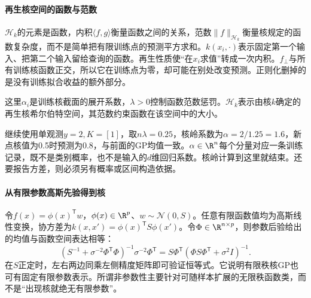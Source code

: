 \paragraph{再生核空间的函数与范数}
$\mathcal H_k$的元素是函数，内积$\langle f,g\rangle$衡量函数之间的关系，范数$\|f\|_{\mathcal H_k}$衡量核规定的函数复杂度，而不是简单把有限训练点的预测平方求和。$k(x_i,\cdot)$表示固定第一个输入、把第二个输入留给查询的函数。再生性质使“在$x_i$求值”转成一次内积。$f_\perp$与所有训练核函数正交，所以它在训练点为零，却可能在别处改变预测。正则化删掉的是没有训练拟合收益的额外部分。

这里$\alpha_i$是训练核截面的展开系数，$\lambda>0$控制函数范数惩罚。$\mathcal H_k$表示由核$k$确定的再生核希尔伯特空间，其范数约束函数在该空间中的大小。

继续使用单观测$y=2,K=[1]$，取$n\lambda=0.25$，核岭系数为$\alpha=2/1.25=1.6$，新点核值为0.5时预测为0.8，与前面的GP均值一致。$\alpha\in\R^n$每个分量对应一条训练记录，既不是类别概率，也不是输入的$d$维回归系数。核岭计算到这里就结束。还要报告方差，则必须另有概率或区间构造依据。

\paragraph{从有限参数高斯先验得到核}
令$f(x)=\phi(x)^{\mathsf T}w$，$\phi(x)\in\R^p$、$w\sim\mathcal N(0,S)$。任意有限函数值均为高斯线性变换，协方差为$k(x,x')=\phi(x)^{\mathsf T}S\phi(x')$。令$\Phi\in\R^{n\times p}$，则参数后验给出的均值与函数空间表达相等：
\begin{equation}
 (S^{-1}+\sigma^{-2}\Phi^{\mathsf T}\Phi)^{-1}\sigma^{-2}\Phi^{\mathsf T}
 =S\Phi^{\mathsf T}(\Phi S\Phi^{\mathsf T}+\sigma^2I)^{-1}.
\end{equation}
在$S$正定时，左右两边同乘左侧精度矩阵即可验证恒等式。它说明有限秩核GP也可有固定有限参数表示。所谓非参数性主要针对可随样本扩展的无限秩函数类，而不是“出现核就绝无有限参数”。

